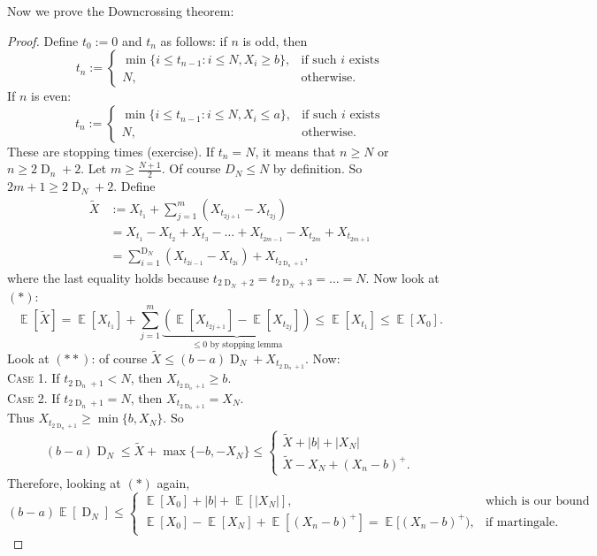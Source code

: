 \documentclass[12pt,a4paper]{report}
\theoremstyle{definition}
\theoremstyle{num.custom-title}
\DeclareMathOperator{\E}{\mathbb{E}}
\DeclareMathOperator{\D}{D}
\renewcommand{\1}{\mathbbm{1}}
\begin{document}
Now we prove the Downcrossing theorem:

\begin{proof}
	Define $t_0 := 0$ and $t_n$ as follows: if $n$ is odd, then
	\[
	t_n :=
	\begin{cases}
	\min\{ i \leq t_{n-1} : i \leq N, X_i \geq b \}, & \text{if such $i$ exists} \\
	N, & \text{otherwise}.
	\end{cases}
	\]
	If $n$ is even:
	\[
	t_n :=
	\begin{cases}
	\min\{ i \leq t_{n-1} : i \leq N, X_i \leq a \}, & \text{if such $i$ exists} \\
	N, & \text{otherwise}.
	\end{cases}
	\]
	These are stopping times (exercise). If $t_n=N$, it means that $n \geq N$ or $n \geq 2\D_n +2$. Let $m \geq \frac{N+1}{2}$. Of course $D_N \leq N$ by definition. So $2m+1 \geq 2\D_N + 2$. Define
	\begin{align*}
	\tilde{X} 
	&:= X_{t_1} + \sum_{j=1}^m (X_{t_{2j+1}} - X_{t_{2j}}) \tag{$*$} \\
	&= X_{t_1} - X_{t_2} + X_{t_3} - \ldots + X_{t_{2m-1}} - X_{t_{2m}} + X_{t_{2m+1}} \\
	&= \sum_{i=1}^{\D_N} (X_{t_{2i-1}} - X_{t_{2i}}) + X_{t_{2\D_n +1}}, \tag{$**$}
	\end{align*}
	where the last equality holds because $t_{2\D_N+2}=t_{2\D_N+3}=...=N$. Now look at $(*)$:
	\[
	\E[\tilde{X}] = \E[X_{t_1}] + \sum_{j=1}^m \underbrace{(\E[X_{t_{2j+1}}] - \E[X_{t_{2j}}])}_{\leq 0 \text{ by stopping lemma}} \leq \E[X_{t_1}] \leq \E[X_0].
	\]
	Look at $(**)$: of course $\tilde{X} \leq (b-a)\D_N + X_{t_{2\D_n +1}}$. Now:\\
	\textsc{Case 1.} If $t_{2\D_n +1} < N$, then $X_{t_{2\D_n +1}} \geq b$.\\
	\textsc{Case 2.} If $t_{2\D_n +1} = N$, then $X_{t_{2\D_n +1}} = X_N$.\\
	Thus $X_{t_{2\D_n +1}} \geq \min\{b,X_N\}$. So
	\[
	(b-a) \D_N \leq \tilde{X} + \max\{-b,-X_N\} \leq
	\begin{cases}
	\tilde{X} + |b| + |X_N| \\
	\tilde{X} - X_N + (X_n-b)^+.
	\end{cases}
	\]
	Therefore, looking at $(*)$ again,
	\[
	(b-a)\E[\D_N] \leq
	\begin{cases}
	\E[X_0] + |b| + \E[|X_N|], & \text{which is our bound} \\
	\E[X_0] - \E[X_N] + \E[(X_n-b)^+] = \E[(X_n-b)^+), & \text{if martingale}.
	\end{cases}
	\]
	
\end{proof}
\end{document}
